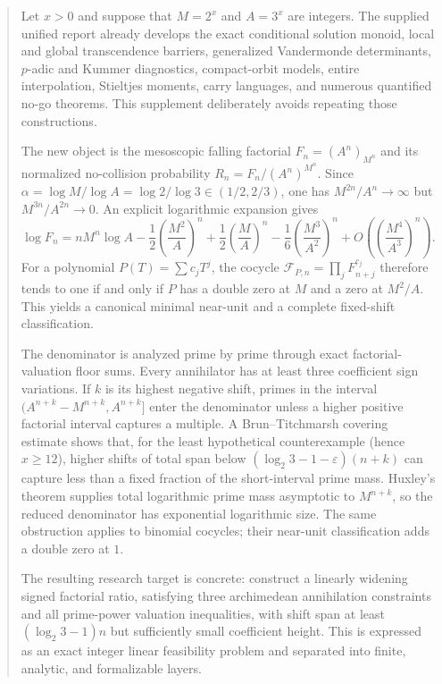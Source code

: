 \documentclass[11pt,oneside]{article}
\theoremstyle{definition}
\theoremstyle{remark}
\newcommand{\cF}{\mathcal F}
\begin{document}
\begin{abstract}
Let $x>0$ and suppose that $M=2^x$ and $A=3^x$ are integers.  The supplied unified report
already develops the exact conditional solution monoid, local and global transcendence
barriers, generalized Vandermonde determinants, $p$-adic and Kummer diagnostics, compact-orbit
models, entire interpolation, Stieltjes moments, carry languages, and numerous quantified
no-go theorems.  This supplement deliberately avoids repeating those constructions.

The new object is the mesoscopic falling factorial
$F_n=(A^n)_{M^n}$ and its normalized no-collision probability
$R_n=F_n/(A^n)^{M^n}$.  Since
$\alpha=\log M/\log A=\log2/\log3\in(1/2,2/3)$, one has
$M^{2n}/A^n\to\infty$ but $M^{3n}/A^{2n}\to0$.  An explicit logarithmic expansion gives
\[
 \log F_n=nM^n\log A-\frac12\left(\frac{M^2}{A}\right)^n
 +\frac12\left(\frac MA\right)^n
 -\frac16\left(\frac{M^3}{A^2}\right)^n
 +O\!\left(\left(\frac{M^4}{A^3}\right)^n\right).
\]
For a polynomial $P(T)=\sum c_jT^j$, the cocycle
$\cF_{P,n}=\prod_jF_{n+j}^{c_j}$ therefore tends to one if and only if
$P$ has a double zero at $M$ and a zero at $M^2/A$.  This yields a canonical minimal
near-unit and a complete fixed-shift classification.

The denominator is analyzed prime by prime through exact factorial-valuation floor sums.
Every annihilator has at least three coefficient sign variations.  If $k$ is its highest
negative shift, primes in the interval
$(A^{n+k}-M^{n+k},A^{n+k}]$ enter the denominator unless a higher positive factorial interval
captures a multiple.  A Brun--Titchmarsh covering estimate shows that, for the least
hypothetical counterexample (hence $x\ge12$), higher shifts of total span below
$(\log_2 3-1-\varepsilon)(n+k)$ can capture less than a fixed fraction of the short-interval
prime mass.  Huxley's theorem supplies total logarithmic prime mass asymptotic to $M^{n+k}$,
so the reduced denominator has exponential logarithmic size.  The same obstruction applies
to binomial cocycles; their near-unit classification adds a double zero at $1$.

The resulting research target is concrete: construct a linearly widening signed factorial
ratio, satisfying three archimedean annihilation constraints and all prime-power valuation
inequalities, with shift span at least $(\log_2 3-1)n$ but sufficiently small coefficient
height.  This is expressed as an exact integer linear feasibility problem and separated into
finite, analytic, and formalizable layers.
\end{abstract}
\end{document}
